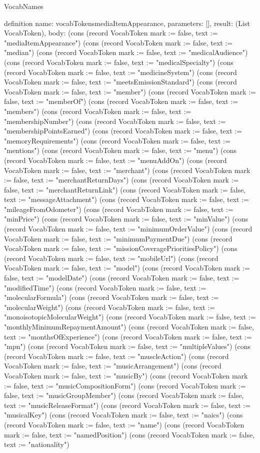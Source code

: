 \begin{lexlean}{VocabNames}
\begin{semanticmodule}
definition{
  name: vocabTokensmediaItemAppearance,
  parameters: [],
  result: (List VocabToken),
  body: (cons (record VocabToken {mark := false, text := "mediaItemAppearance"}) (cons (record VocabToken {mark := false, text := "median"}) (cons (record VocabToken {mark := false, text := "medicalAudience"}) (cons (record VocabToken {mark := false, text := "medicalSpecialty"}) (cons (record VocabToken {mark := false, text := "medicineSystem"}) (cons (record VocabToken {mark := false, text := "meetsEmissionStandard"}) (cons (record VocabToken {mark := false, text := "member"}) (cons (record VocabToken {mark := false, text := "memberOf"}) (cons (record VocabToken {mark := false, text := "members"}) (cons (record VocabToken {mark := false, text := "membershipNumber"}) (cons (record VocabToken {mark := false, text := "membershipPointsEarned"}) (cons (record VocabToken {mark := false, text := "memoryRequirements"}) (cons (record VocabToken {mark := false, text := "mentions"}) (cons (record VocabToken {mark := false, text := "menu"}) (cons (record VocabToken {mark := false, text := "menuAddOn"}) (cons (record VocabToken {mark := false, text := "merchant"}) (cons (record VocabToken {mark := false, text := "merchantReturnDays"}) (cons (record VocabToken {mark := false, text := "merchantReturnLink"}) (cons (record VocabToken {mark := false, text := "messageAttachment"}) (cons (record VocabToken {mark := false, text := "mileageFromOdometer"}) (cons (record VocabToken {mark := false, text := "minPrice"}) (cons (record VocabToken {mark := false, text := "minValue"}) (cons (record VocabToken {mark := false, text := "minimumOrderValue"}) (cons (record VocabToken {mark := false, text := "minimumPaymentDue"}) (cons (record VocabToken {mark := false, text := "missionCoveragePrioritiesPolicy"}) (cons (record VocabToken {mark := false, text := "mobileUrl"}) (cons (record VocabToken {mark := false, text := "model"}) (cons (record VocabToken {mark := false, text := "modelDate"}) (cons (record VocabToken {mark := false, text := "modifiedTime"}) (cons (record VocabToken {mark := false, text := "molecularFormula"}) (cons (record VocabToken {mark := false, text := "molecularWeight"}) (cons (record VocabToken {mark := false, text := "monoisotopicMolecularWeight"}) (cons (record VocabToken {mark := false, text := "monthlyMinimumRepaymentAmount"}) (cons (record VocabToken {mark := false, text := "monthsOfExperience"}) (cons (record VocabToken {mark := false, text := "mpn"}) (cons (record VocabToken {mark := false, text := "multipleValues"}) (cons (record VocabToken {mark := false, text := "muscleAction"}) (cons (record VocabToken {mark := false, text := "musicArrangement"}) (cons (record VocabToken {mark := false, text := "musicBy"}) (cons (record VocabToken {mark := false, text := "musicCompositionForm"}) (cons (record VocabToken {mark := false, text := "musicGroupMember"}) (cons (record VocabToken {mark := false, text := "musicReleaseFormat"}) (cons (record VocabToken {mark := false, text := "musicalKey"}) (cons (record VocabToken {mark := false, text := "naics"}) (cons (record VocabToken {mark := false, text := "name"}) (cons (record VocabToken {mark := false, text := "namedPosition"}) (cons (record VocabToken {mark := false, text := "nationality"}) }
\end{semanticmodule}
\end{lexlean}

